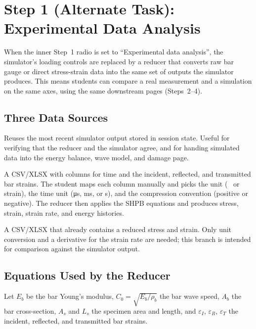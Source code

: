 \documentclass[11pt,a4paper]{article}
\newcommand{\eps}{\varepsilon}
\newcommand{\Cz}{C_0}
\newcommand{\Ab}{A_b}
\newcommand{\As}{A_s}
\newcommand{\Ls}{L_s}
\begin{document}
\section{Step 1 (Alternate Task): Experimental Data Analysis}
\label{sec:expdata}
\label{subsec:expdata}

When the inner Step~1 radio is set to ``Experimental data analysis'', the
simulator's loading controls are replaced by a reducer that converts raw bar
gauge or direct stress-strain data into the same set of outputs the simulator
produces. This means students can compare a real measurement and a simulation
on the same axes, using the same downstream pages (Steps~2--4).

\subsection{Three Data Sources}

\begin{description}[leftmargin=2em, style=nextline]
  \item[Latest simulator result]
    Reuses the most recent simulator output stored in session state. Useful
    for verifying that the reducer and the simulator agree, and for handing
    simulated data into the energy balance, wave model, and damage page.

  \item[Upload bar strain gauges]
    A CSV/XLSX with columns for time and the incident, reflected, and
    transmitted bar strains. The student maps each column manually and picks
    the unit (\si{\micro\strain} or strain), the time unit
    (\si{\micro s}, ms, or s), and the compression convention (positive or
    negative). The reducer then applies the SHPB equations and produces
    stress, strain, strain rate, and energy histories.

  \item[Upload direct stress-strain]
    A CSV/XLSX that already contains a reduced stress and strain. Only unit
    conversion and a derivative for the strain rate are needed; this branch
    is intended for comparison against the simulator output.
\end{description}

\subsection{Equations Used by the Reducer}

Let $E_b$ be the bar Young's modulus, $\Cz = \sqrt{E_b/\rho_b}$ the bar wave
speed, $\Ab$ the bar cross-section, $\As$ and $\Ls$ the specimen area and
length, and $\eps_I$, $\eps_R$, $\eps_T$ the incident, reflected, and
transmitted bar strains.
\end{document}
